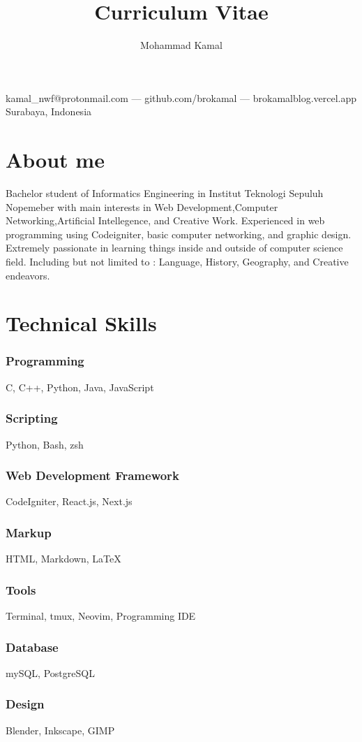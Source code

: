 \documentclass{article}
\makeatletter
\renewcommand{\maketitle}{
\begin{center}
{\huge\bfseries
\theauthor}




\vspace{.25em}

kamal\_nwf@protonmail.com --- github.com/brokamal --- brokamalblog.vercel.app\\
Surabaya, Indonesia 

\end{center}

}
\makeatother
\begin{document}
\title{Curriculum Vitae}
\author{Mohammad Kamal}

\maketitle

\section{About me}
Bachelor student of Informatics Engineering in Institut Teknologi Sepuluh Nopemeber with main interests in Web Development,Computer Networking,Artificial Intellegence, and Creative Work. Experienced in web programming using Codeigniter, basic computer networking, and graphic design. 
\\[1em]
Extremely passionate in learning things inside and outside of computer science field. Including but not limited to : Language, History, Geography, and Creative endeavors. 
\section{Technical Skills}



\subsubsection{Programming}
C, C++, Python, Java, JavaScript
\subsubsection{Scripting}
Python, Bash, zsh
\subsubsection{Web Development Framework}
CodeIgniter, React.js, Next.js
\subsubsection{Markup}
HTML, Markdown, LaTeX
\subsubsection{Tools}
Terminal, tmux, Neovim, Programming IDE
\subsubsection{Database}
mySQL, PostgreSQL
\subsubsection{Design}
Blender, Inkscape, GIMP
\end{document}
